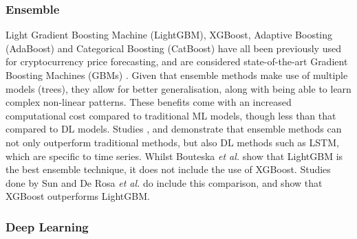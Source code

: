 \documentclass[ %
                    author={Raj Dhakan},
                supervisor={Dr. Ayush Joshi},
                    degree={MSc},
                     title={Ethereum Price Prediction using Internal and External Factors},
                  subtitle={},
                      type={},
                      year={2025}]{dissertation}
\begin{document}
\subsubsection{Ensemble}
Light Gradient Boosting Machine (LightGBM), XGBoost, Adaptive Boosting (AdaBoost) and Categorical Boosting (CatBoost) have all been previously used for cryptocurrency price forecasting, and are considered state-of-the-art Gradient Boosting Machines (GBMs) \cite{bouteska2024cryptocurrency,de2023practical, sun2024cryptocurrency}. Given that ensemble methods make use of multiple models (trees), they allow for better generalisation, along with being able to learn complex non-linear patterns. These benefits come with an increased computational cost compared to traditional ML models, though less than that compared to DL models. Studies \cite{bouteska2024cryptocurrency}, \cite{de2023practical} and \cite{ sun2024cryptocurrency} demonstrate that ensemble methods can not only outperform traditional methods, but also DL methods such as LSTM, which are specific to time series. Whilst Bouteska \textit{et al.} \cite{bouteska2024cryptocurrency} show that LightGBM is the best ensemble technique, it does not include the use of XGBoost. Studies done by Sun \cite{sun2024cryptocurrency} and De Rosa \textit{et al.} \cite{de2023practical} do include this comparison, and show that XGBoost outperforms LightGBM. 

\subsubsection{Deep Learning}
\end{document}
